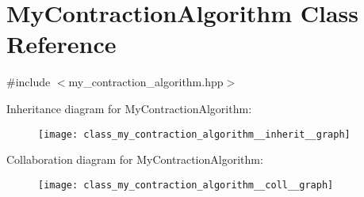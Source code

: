 \hypertarget{class_my_contraction_algorithm}{}\section{My\+Contraction\+Algorithm Class Reference}
\label{class_my_contraction_algorithm}


{\ttfamily \#include $<$my\+\_\+contraction\+\_\+algorithm.\+hpp$>$}



Inheritance diagram for My\+Contraction\+Algorithm\+:\nopagebreak
\begin{figure}[H]
\begin{center}
\leavevmode
\texttt{[image: class\_my\_contraction\_algorithm\_\_inherit\_\_graph]}
\end{center}
\end{figure}


Collaboration diagram for My\+Contraction\+Algorithm\+:\nopagebreak
\begin{figure}[H]
\begin{center}
\leavevmode
\texttt{[image: class\_my\_contraction\_algorithm\_\_coll\_\_graph]}
\end{center}
\end{figure}
